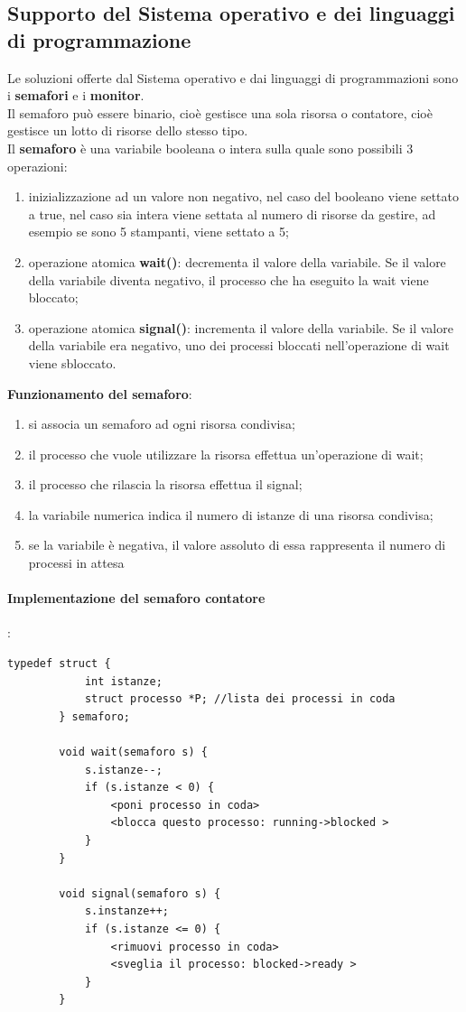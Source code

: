 \documentclass[12pt, letterpaper]{report}
\begin{document}
	\subsection{Supporto del Sistema operativo e dei linguaggi di programmazione}
	Le soluzioni offerte dal Sistema operativo e dai linguaggi di programmazioni sono i \textbf{semafori} e i \textbf{monitor}. \\
	Il semaforo può essere binario, cioè gestisce una sola risorsa o contatore, cioè gestisce un lotto di risorse dello stesso tipo. \\
	Il \textbf{semaforo} è una variabile booleana o intera sulla quale sono possibili 3 operazioni:
	\begin{enumerate}
		\item inizializzazione ad un valore non negativo, nel caso del booleano viene settato a true, nel caso sia intera viene settata al numero di risorse da gestire, ad esempio se sono 5 stampanti, viene settato a 5;
		\item operazione atomica \textbf{wait()}: decrementa il valore della variabile. Se il valore della variabile diventa negativo, il processo che ha eseguito la wait viene bloccato;
		\item operazione atomica \textbf{signal()}: incrementa il valore della variabile. Se il valore della variabile era negativo, uno dei processi bloccati nell'operazione di wait viene sbloccato.
	\end{enumerate}
	\textbf{Funzionamento del semaforo}:
	\begin{enumerate}
		\item si associa un semaforo ad ogni risorsa condivisa;
		\item il processo che vuole utilizzare la risorsa effettua un'operazione di wait;
		\item il processo che rilascia la risorsa effettua il signal;
		\item la variabile numerica indica il numero di istanze di una risorsa condivisa;
		\item se la variabile è negativa, il valore assoluto di essa rappresenta il numero di processi in attesa
	\end{enumerate}
	\paragraph{Implementazione del semaforo contatore}:
	\begin{lstlisting}[style=pascalstyle]
		typedef struct {
			int istanze;
			struct processo	*P; //lista dei processi in coda
		} semaforo;

		void wait(semaforo s) {
			s.istanze--;
			if (s.istanze < 0) {
				<poni processo in coda>
				<blocca questo processo: running->blocked >
			}
		}

		void signal(semaforo s) {
			s.instanze++;
			if (s.istanze <= 0) {
				<rimuovi processo in coda>
				<sveglia il processo: blocked->ready >
			}
		}
	\end{lstlisting}
\end{document}
